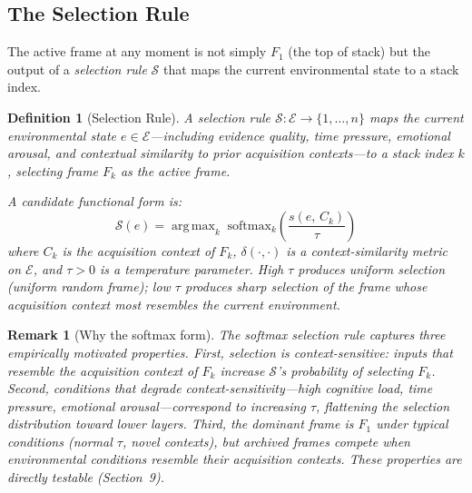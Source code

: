 \documentclass[12pt]{article}
\newtheorem{definition}{Definition}
\newtheorem{remark}{Remark}
\begin{document}
\subsection{The Selection Rule}

The active frame at any moment is not simply $F_1$ (the top of stack)
but the output of a \emph{selection rule} $\mathcal{S}$ that maps
the current environmental state to a stack index.

\begin{definition}[Selection Rule]
A \emph{selection rule}
$\mathcal{S}: \mathcal{E} \to \{1, \ldots, n\}$
maps the current environmental state $e \in \mathcal{E}$---including
evidence quality, time pressure, emotional arousal, and
contextual similarity to prior acquisition contexts---to a stack
index $k$, selecting frame $F_k$ as the active frame.

A candidate functional form is:
\[
\mathcal{S}(e) = \operatorname{arg\,max}_k\; \mathrm{softmax}_k
\!\left(\frac{s(e,\, C_k)}{\tau}\right)
\]
where $C_k$ is the acquisition context of $F_k$,
$\delta(\cdot, \cdot)$ is a context-similarity metric on
$\mathcal{E}$, and $\tau > 0$ is a temperature parameter.
High $\tau$ produces uniform selection (uniform random frame);
low $\tau$ produces sharp selection of the frame whose acquisition
context most resembles the current environment.
\end{definition}

\begin{remark}[Why the softmax form]
The softmax selection rule captures three empirically motivated
properties.
First, selection is context-sensitive: inputs that resemble
the acquisition context of $F_k$ increase $\mathcal{S}$'s
probability of selecting $F_k$.
Second, conditions that degrade context-sensitivity---high cognitive
load, time pressure, emotional arousal---correspond to increasing
$\tau$, flattening the selection distribution toward lower layers.
Third, the dominant frame is $F_1$ under typical conditions (normal
$\tau$, novel contexts), but archived frames compete when
environmental conditions resemble their acquisition contexts.
These properties are directly testable (Section~9).
\end{remark}
\end{document}
